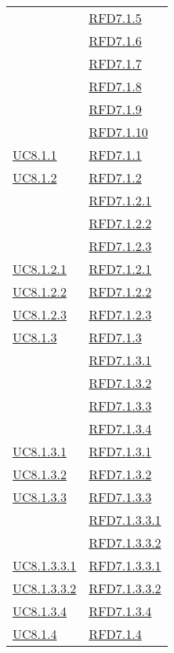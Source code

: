 \begin{longtable}{|>{\centering}m{5cm}|m{5cm}<{\centering}|}
& \hyperlink{RFD7.1.5}{RFD7.1.5}\\
& \hyperlink{RFD7.1.6}{RFD7.1.6}\\
& \hyperlink{RFD7.1.7}{RFD7.1.7}\\
& \hyperlink{RFD7.1.8}{RFD7.1.8}\\
& \hyperlink{RFD7.1.9}{RFD7.1.9}\\
& \hyperlink{RFD7.1.10}{RFD7.1.10}\\ \hline
\hyperref[UC8.1.1]{UC8.1.1} & \hyperlink{RFD7.1.1}{RFD7.1.1}\\ \hline
\hyperref[UC8.1.2]{UC8.1.2} & \hyperlink{RFD7.1.2}{RFD7.1.2}\\
& \hyperlink{RFD7.1.2.1}{RFD7.1.2.1}\\
& \hyperlink{RFD7.1.2.2}{RFD7.1.2.2}\\
& \hyperlink{RFD7.1.2.3}{RFD7.1.2.3}\\ \hline
\hyperref[UC8.1.2.1]{UC8.1.2.1} & \hyperlink{RFD7.1.2.1}{RFD7.1.2.1}\\ \hline
\hyperref[UC8.1.2.2]{UC8.1.2.2} & \hyperlink{RFD7.1.2.2}{RFD7.1.2.2}\\ \hline
\hyperref[UC8.1.2.3]{UC8.1.2.3} & \hyperlink{RFD7.1.2.3}{RFD7.1.2.3}\\ \hline
\hyperref[UC8.1.3]{UC8.1.3} & \hyperlink{RFD7.1.3}{RFD7.1.3}\\
& \hyperlink{RFD7.1.3.1}{RFD7.1.3.1}\\
& \hyperlink{RFD7.1.3.2}{RFD7.1.3.2}\\
& \hyperlink{RFD7.1.3.3}{RFD7.1.3.3}\\
& \hyperlink{RFD7.1.3.4}{RFD7.1.3.4}\\ \hline
\hyperref[UC8.1.3.1]{UC8.1.3.1} & \hyperlink{RFD7.1.3.1}{RFD7.1.3.1}\\ \hline
\hyperref[UC8.1.3.2]{UC8.1.3.2} & \hyperlink{RFD7.1.3.2}{RFD7.1.3.2}\\ \hline
\hyperref[UC8.1.3.3]{UC8.1.3.3} & \hyperlink{RFD7.1.3.3}{RFD7.1.3.3}\\
& \hyperlink{RFD7.1.3.3.1}{RFD7.1.3.3.1}\\
& \hyperlink{RFD7.1.3.3.2}{RFD7.1.3.3.2}\\ \hline
\hyperref[UC8.1.3.3.1]{UC8.1.3.3.1} & \hyperlink{RFD7.1.3.3.1}{RFD7.1.3.3.1}\\ \hline
\hyperref[UC8.1.3.3.2]{UC8.1.3.3.2} & \hyperlink{RFD7.1.3.3.2}{RFD7.1.3.3.2}\\ \hline
\hyperref[UC8.1.3.4]{UC8.1.3.4} & \hyperlink{RFD7.1.3.4}{RFD7.1.3.4}\\ \hline
\hyperref[UC8.1.4]{UC8.1.4} & \hyperlink{RFD7.1.4}{RFD7.1.4}\\

\end{longtable}
